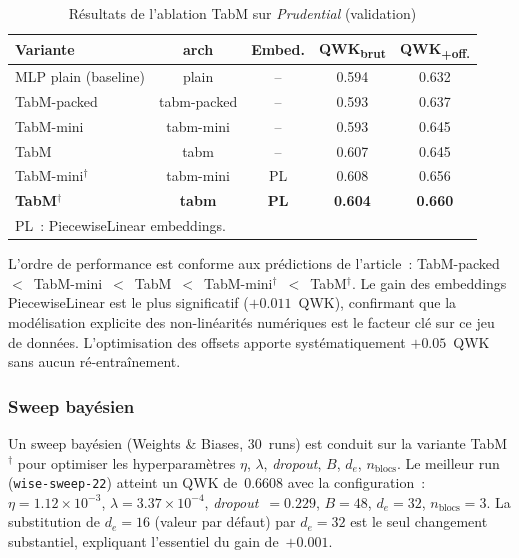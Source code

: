 \documentclass[conference]{IEEEtran}
\begin{document}
\begin{table}[htbp]
\caption{Résultats de l'ablation TabM sur \textit{Prudential} (validation)}
\label{tab:ablation_tabm}
\centering
\begin{tabular}{lcccc}
\toprule
\textbf{Variante} & \textbf{arch} & \textbf{Embed.} &
\textbf{QWK\textsubscript{brut}} & \textbf{QWK\textsubscript{+off.}} \\
\midrule
MLP plain (baseline)    & plain      & --  & 0.594 & 0.632 \\
TabM-packed             & tabm-packed & --  & 0.593 & 0.637 \\
TabM-mini               & tabm-mini  & --  & 0.593 & 0.645 \\
TabM                    & tabm       & --  & 0.607 & 0.645 \\
TabM-mini$^\dagger$     & tabm-mini  & PL  & 0.608 & 0.656 \\
\textbf{TabM$^\dagger$} & \textbf{tabm} & \textbf{PL} &
\textbf{0.604} & \textbf{0.660} \\
\bottomrule
\multicolumn{5}{l}{\footnotesize PL~: PiecewiseLinear embeddings.}
\end{tabular}
\end{table}

L'ordre de performance est conforme aux prédictions de l'article~:
TabM-packed~$<$~TabM-mini~$<$~TabM~$<$~TabM-mini$^\dagger$~$<$~TabM$^\dagger$.
Le gain des embeddings PiecewiseLinear est le plus significatif ($+0.011$~QWK),
confirmant que la modélisation explicite des non-linéarités numériques est le
facteur clé sur ce jeu de données. L'optimisation des offsets apporte
systématiquement $+0.05$~QWK sans aucun ré-entraînement.

\subsubsection{Sweep bayésien}

Un sweep bayésien (Weights \& Biases, 30~runs) est conduit sur la variante
TabM$^\dagger$ pour optimiser les hyperparamètres
$\eta$, $\lambda$, \textit{dropout}, $B$, $d_e$, $n_{\text{blocs}}$.
Le meilleur run (\texttt{wise-sweep-22}) atteint un QWK de~$\mathbf{0.6608}$
avec la configuration~: $\eta=1.12\times10^{-3}$, $\lambda=3.37\times10^{-4}$,
\textit{dropout}~$=0.229$, $B=48$, $d_e=32$, $n_{\text{blocs}}=3$.
La substitution de $d_e=16$ (valeur par défaut) par $d_e=32$ est le seul
changement substantiel, expliquant l'essentiel du gain de~$+0.001$.
\end{document}
